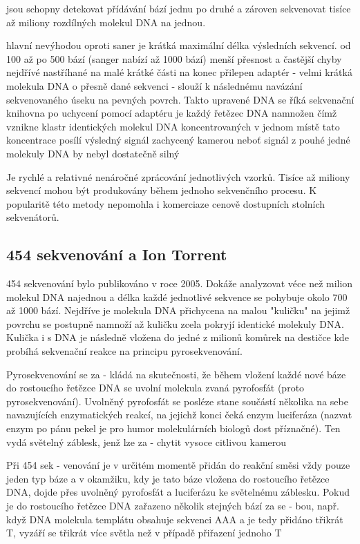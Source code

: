 \documentclass[czech,DP]{thesiskiv}
\begin{document}
jsou schopny detekovat přídávání bází jednu po druhé a zároven sekvenovat tisíce až miliony rozdílných molekul DNA na jednou. 

hlavní nevýhodou oproti saner je krátká maximální délka výsledních sekvencí. od 100 až po 500 bází (sanger nabízí až 1000 bází)
menší přesnost a častější chyby
nejdřívé nastříhané na malé krátké části na konec přilepen adaptér - velmi krátká molekula DNA o přesně dané sekvenci
- slouží k následnému navázání sekvenovaného úseku na pevných povrch. Takto upravené DNA se říká sekvenační knihovna
po uchycení pomocí adaptéru je každý řetězec DNA namnožen čímž vznikne klastr identických molekul DNA koncentrovaných v jednom místě
tato koncentrace posílí výsledný signál zachycený kamerou neboť signál z pouhé jedné molekuly DNA by nebyl dostatečně silný
 
Je rychlé a relativné nenáročné zprácování jednotlivých vzorků. Tisíce až miliony sekvencí mohou být produkovány během jednoho sekvenčního procesu. K popularitě této metody nepomohla i komerciaze cenově dostupních stolních sekvenátorů.


\subsection{454 sekvenování a Ion Torrent}
454 sekvenování bylo publikováno v roce 2005. Dokáže analyzovat véce než milion molekul DNA najednou a délka každé jednotlivé sekvence se pohybuje okolo 700 až 1000 bází.
Nejdříve je molekula DNA přichycena na malou "kuličku" na jejimž povrchu se postupně namnoží až kuličku zcela pokryjí identické molekuly DNA.
Kulička i s DNA je následně vložena do jedné z milionů komůrek na destičce kde probíhá sekvenační reakce na principu pyrosekvenování.

 Pyrosekvenování se za -
kládá na skutečnosti, že během vložení
každé nové báze do rostoucího řetězce
DNA se uvolní molekula zvaná pyrofosfát
(proto pyrosekvenování). Uvolněný pyrofosfát se posléze stane součástí několika
na sebe navazujících enzymatických reakcí, na jejichž konci čeká enzym luciferáza
(nazvat enzym po pánu pekel je pro humor
molekulárních biologů dost příznačné).
Ten vydá světelný záblesk, jenž lze za -
chytit vysoce citlivou kamerou

 Při 454 sek -
venování je v určitém momentě přidán do
reakční směsi vždy pouze jeden typ báze
a v okamžiku, kdy je tato báze vložena do
rostoucího řetězce DNA, dojde přes uvolněný pyrofosfát a luciferázu ke světelnému
záblesku. Pokud je do rostoucího řetězce
DNA zařazeno několik stejných bází za se -
bou, např. když DNA molekula templátu
obsahuje sekvenci AAA a je tedy přidáno
třikrát T, vyzáří se třikrát více světla než
v případě přiřazení jednoho T
\end{document}
